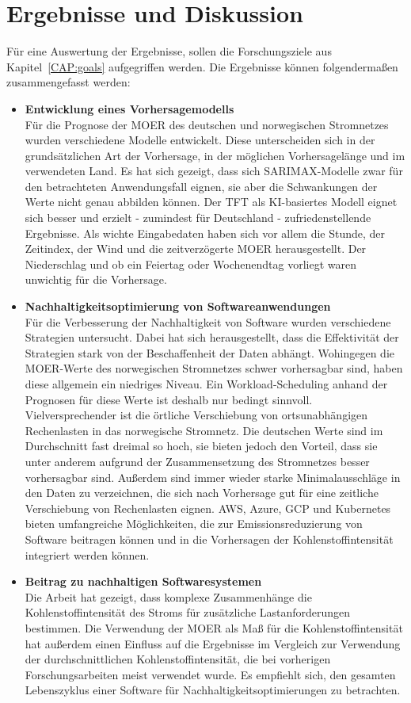 \chapter{Ergebnisse und Diskussion}\label{CAP:results}
Für eine Auswertung der Ergebnisse, sollen die Forschungsziele aus Kapitel~\ref{CAP:goals} aufgegriffen werden.
Die Ergebnisse können folgendermaßen zusammengefasst werden:
\begin{itemize}
 \item \textbf{Entwicklung eines Vorhersagemodells} \\
 Für die Prognose der \ac{MOER} des deutschen und norwegischen Stromnetzes wurden verschiedene Modelle entwickelt.
 Diese unterscheiden sich in der grundsätzlichen Art der Vorhersage, in der möglichen Vorhersagelänge und im verwendeten Land.
 Es hat sich gezeigt, dass sich \ac{SARIMAX}-Modelle zwar für den betrachteten Anwendungsfall eignen, sie aber die Schwankungen der Werte nicht genau abbilden können.
 Der \ac{TFT} als \ac{KI}-basiertes Modell eignet sich besser und erzielt - zumindest für Deutschland - zufriedenstellende Ergebnisse.
 Als wichte Eingabedaten haben sich vor allem die Stunde, der Zeitindex, der Wind und die zeitverzögerte \ac{MOER} herausgestellt.
 Der Niederschlag und ob ein Feiertag oder Wochenendtag vorliegt waren unwichtig für die Vorhersage.
 \item \textbf{Nachhaltigkeitsoptimierung von Softwareanwendungen} \\
 Für die Verbesserung der Nachhaltigkeit von Software wurden verschiedene Strategien untersucht.
 Dabei hat sich herausgestellt, dass die Effektivität der Strategien stark von der Beschaffenheit der Daten abhängt.
 Wohingegen die \ac{MOER}-Werte des norwegischen Stromnetzes schwer vorhersagbar sind, haben diese allgemein ein niedriges Niveau.
 Ein Workload-Scheduling anhand der Prognosen für diese Werte ist deshalb nur bedingt sinnvoll.
 Vielversprechender ist die örtliche Verschiebung von ortsunabhängigen Rechenlasten in das norwegische Stromnetz.
 Die deutschen Werte sind im Durchschnitt fast dreimal so hoch, sie bieten jedoch den Vorteil, dass sie unter anderem aufgrund der Zusammensetzung des Stromnetzes besser vorhersagbar sind.
 Außerdem sind immer wieder starke Minimalausschläge in den Daten zu verzeichnen, die sich nach Vorhersage gut für eine zeitliche Verschiebung von Rechenlasten eignen.
 \ac{AWS}, Azure, \ac{GCP} und Kubernetes bieten umfangreiche Möglichkeiten, die zur Emissionsreduzierung von Software beitragen können und in die Vorhersagen der Kohlenstoffintensität integriert werden können.
 \item \textbf{Beitrag zu nachhaltigen Softwaresystemen} \\
 Die Arbeit hat gezeigt, dass komplexe Zusammenhänge die Kohlenstoffintensität des Stroms für zusätzliche Lastanforderungen bestimmen.
 Die Verwendung der \ac{MOER} als Maß für die Kohlenstoffintensität hat außerdem einen Einfluss auf die Ergebnisse im Vergleich zur Verwendung der durchschnittlichen Kohlenstoffintensität, die bei vorherigen Forschungsarbeiten meist verwendet wurde.
 Es empfiehlt sich, den gesamten Lebenszyklus einer Software für Nachhaltigkeitsoptimierungen zu betrachten.
\end{itemize}
